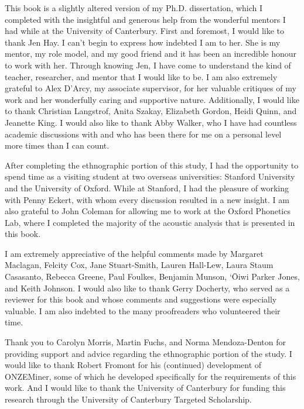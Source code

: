 \begin{refsection}

\noindent This book is a slightly altered version of my Ph.D. dissertation, which I completed with the insightful and generous help from the wonderful mentors I had while at the University of Canterbury.  First and foremost, I would like to thank Jen Hay.  I can't begin to express how indebted I am to her.  She is my mentor, my role model, and my good friend and it has been an incredible honour to work with her.  Through knowing Jen, I have come to understand the kind of teacher, researcher, and mentor that I would like to be.  I am also extremely grateful to Alex D'Arcy, my associate supervisor, for her valuable critiques of my work and her wonderfully caring and supportive nature.  Additionally, I would like to thank Christian Langstrof, Anita Szakay, Elizabeth Gordon, Heidi Quinn, and Jeanette King.  I would also like to thank Abby Walker, who I have had countless academic discussions with and who has been there for me on a personal level more times than I can count.

After completing the ethnographic portion of this study, I had the opportunity to spend time as a visiting student at two overseas universities: Stanford University and the University of Oxford.  While at Stanford, I had the pleasure of working with Penny Eckert, with whom every discussion resulted in a new insight.  I am also grateful to John Coleman for allowing me to work at the Oxford Phonetics Lab, where I completed the majority of the acoustic analysis that is presented in this book.  

I am extremely appreciative of the helpful comments made by Margaret Maclagan, Felcity Cox, Jane Stuart-Smith, Lauren Hall-Lew, Laura Staum Casasanto, Rebecca Greene, Paul Foulkes, Benjamin Munson, `\=Oiwi Parker Jones, and Keith Johnson.  I would also like to thank Gerry Docherty, who served as a reviewer for this book and whose comments and suggestions were especially valuable. I am also indebted to the many proofreaders who volunteered their time.

\largerpage
Thank you to Carolyn Morris, Martin Fuchs, and Norma Men\-doza-Den\-ton for providing support and advice regarding the ethnographic portion of the study.  I would like to thank Robert Fromont for his (continued) development of ONZEMiner, some of which he developed specifically for the requirements of this work.  And I would like to thank the University of Canterbury for funding this research through the University of Canterbury Targeted Scholarship.


\end{refsection}
